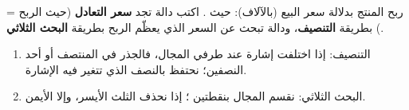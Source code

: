 \begin{statement}
ربح المنتج بدلالة سعر البيع  (بالآلاف):  حيث . اكتب دالة  تجد \textbf{سعر التعادل} (حيث الربح = ) بطريقة \textbf{التنصيف}، ودالة  تبحث عن السعر الذي يعظّم الربح بطريقة \textbf{البحث الثلاثي}.
\end{statement}
\begin{stepsbox}\begin{enumerate}
\item التنصيف: إذا اختلفت إشارة  عند طرفي المجال، فالجذر في المنتصف أو أحد النصفين؛ نحتفظ بالنصف الذي تتغير فيه الإشارة.
\item البحث الثلاثي: نقسم المجال بنقطتين ؛ إذا  نحذف الثلث الأيسر، وإلا الأيمن.
\end{enumerate}\end{stepsbox}
